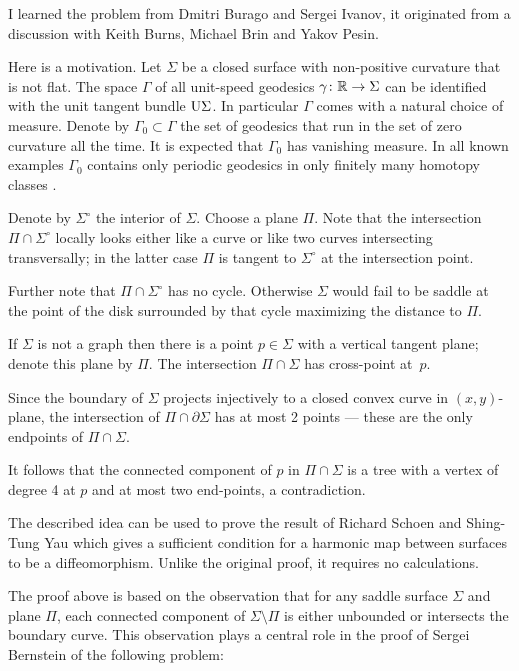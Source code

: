 I learned the problem from 
Dmitri Burago 
and Sergei Ivanov, 
it originated from a discussion with
Keith Burns, 
Michael Brin 
and Yakov Pesin.

Here is a motivation.
Let $\Sigma$ be a closed surface with non-positive curvature that is not flat.
The space $\Gamma$ of all unit-speed geodesics $\gamma\:\RR\z\to\Sigma$ can be identified with the unit tangent bundle $\mathrm{U}\Sigma$. 
In particular $\Gamma$ comes with a natural choice of measure.
Denote by $\Gamma_0\subset \Gamma$ the set of geodesics that run in the set of zero curvature all the time.
It is expected that $\Gamma_0$ has vanishing measure.
In all known examples $\Gamma_0$ contains only periodic geodesics in only finitely many homotopy classes \cite[see also][]{hertz}.

Denote by $\Sigma^\circ$ the interior of $\Sigma$.
Choose a plane $\Pi$. 
Note that the intersection $\Pi\cap \Sigma^\circ$ 
locally looks either like a curve or like two curves intersecting transversally;
in the latter case $\Pi$ is tangent to $\Sigma^\circ$ at the intersection point.

Further note that $\Pi\cap \Sigma^\circ$ has no cycle.
Otherwise $\Sigma$ would fail to be saddle at the point of the disk surrounded by that cycle maximizing the distance to $\Pi$.

If $\Sigma$ is not a graph then there is a point $p\in\Sigma$ with a vertical tangent plane;
denote this plane by $\Pi$.
The intersection $\Pi\cap\Sigma$ has cross-point at~$p$.

Since the boundary of $\Sigma$ projects injectively to a closed convex curve in $(x,y)$-plane,
the intersection of $\Pi\cap\partial \Sigma$ has at most 2 points --- these are the only endpoints of $\Pi\cap\Sigma$.

It follows that the connected component of $p$ in $\Pi\cap\Sigma$ is a tree 
with a vertex of degree 4 at $p$ and at most two end-points, a contradiction.\qeds

The described idea can be used to prove the result of Richard Schoen and Shing-Tung  Yau \cite{schoen-yau-2D} which gives a sufficient condition for a harmonic map between surfaces to be a diffeomorphism.
Unlike the original proof, it requires no calculations.

The proof above is based on the observation 
that for any saddle surface $\Sigma$ and plane $\Pi$,
each connected component of $\Sigma\setminus \Pi$ is either unbounded or intersects the boundary curve.
This observation plays a central role in the proof of Sergei Bernstein \cite{bernshtein}
of the following problem:

